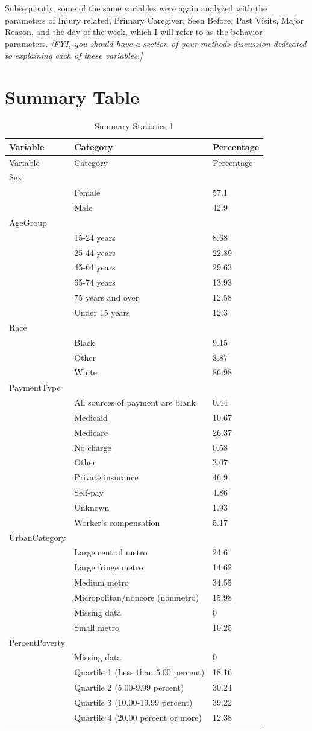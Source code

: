 \documentclass[12pt,twoside]{reedthesis}
\begin{document}
  Subsequently, some of the same variables were again analyzed with the
  parameters of Injury related, Primary Caregiver, Seen Before, Past
  Visits, Major Reason, and the day of the week, which I will refer to as
  the behavior parameters. \emph{{[}FYI, you should have a section of your
  methods discussion dedicated to explaining each of these variables.{]}}
  
  \newpage 
  
  \section{Summary Table}\label{summary-table}
  
  \singlespacing
  
  \begin{longtable}[c]{@{}lll@{}}
  \caption{Summary Statistics 1 \label{tab:sums}}\tabularnewline
  \toprule
  Variable & Category & Percentage\tabularnewline
  \midrule
  \endfirsthead
  \toprule
  Variable & Category & Percentage\tabularnewline
  \midrule
  \endhead
  Sex & &\tabularnewline
  & Female & 57.1\tabularnewline
  & Male & 42.9\tabularnewline
  AgeGroup & &\tabularnewline
  & 15-24 years & 8.68\tabularnewline
  & 25-44 years & 22.89\tabularnewline
  & 45-64 years & 29.63\tabularnewline
  & 65-74 years & 13.93\tabularnewline
  & 75 years and over & 12.58\tabularnewline
  & Under 15 years & 12.3\tabularnewline
  Race & &\tabularnewline
  & Black & 9.15\tabularnewline
  & Other & 3.87\tabularnewline
  & White & 86.98\tabularnewline
  PaymentType & &\tabularnewline
  & All sources of payment are blank & 0.44\tabularnewline
  & Medicaid & 10.67\tabularnewline
  & Medicare & 26.37\tabularnewline
  & No charge & 0.58\tabularnewline
  & Other & 3.07\tabularnewline
  & Private insurance & 46.9\tabularnewline
  & Self-pay & 4.86\tabularnewline
  & Unknown & 1.93\tabularnewline
  & Worker's compensation & 5.17\tabularnewline
  UrbanCategory & &\tabularnewline
  & Large central metro & 24.6\tabularnewline
  & Large fringe metro & 14.62\tabularnewline
  & Medium metro & 34.55\tabularnewline
  & Micropolitan/noncore (nonmetro) & 15.98\tabularnewline
  & Missing data & 0\tabularnewline
  & Small metro & 10.25\tabularnewline
  PercentPoverty & &\tabularnewline
  & Missing data & 0\tabularnewline
  & Quartile 1 (Less than 5.00 percent) & 18.16\tabularnewline
  & Quartile 2 (5.00-9.99 percent) & 30.24\tabularnewline
  & Quartile 3 (10.00-19.99 percent) & 39.22\tabularnewline
  & Quartile 4 (20.00 percent or more) & 12.38\tabularnewline
  \bottomrule
  \end{longtable}
  
\end{document}
